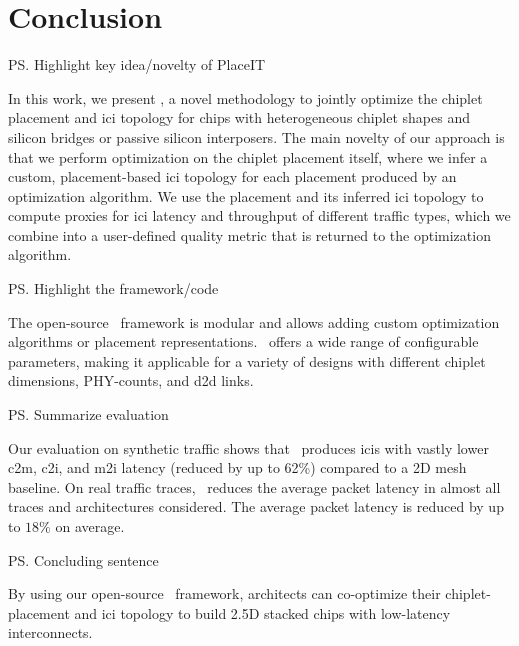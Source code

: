 \section{Conclusion}
\label{sec:conclusion}
\vspace{0.7em}

\ps{Highlight key idea/novelty of PlaceIT}

In this work, we present \name, a novel methodology to jointly optimize the chiplet placement and \gls{ici} topology for chips with heterogeneous chiplet shapes and silicon bridges or passive silicon interposers.
The main novelty of our approach is that we perform optimization on the chiplet placement itself, where we infer a custom, placement-based \gls{ici} topology for each placement produced by an optimization algorithm.
We use the placement and its inferred \gls{ici} topology to compute proxies for \gls{ici} latency and throughput of different traffic types, which we combine into a user-defined quality metric that is returned to the optimization algorithm.

\ps{Highlight the framework/code}

The open-source \name~framework is modular and allows adding custom optimization algorithms or placement representations.
\name~offers a wide range of configurable parameters, making it applicable for a variety of designs with different chiplet dimensions, PHY-counts, and \gls{d2d} links.

\ps{Summarize evaluation}

Our evaluation on synthetic traffic shows that \name~produces \gls{ici}s with vastly lower \gls{c2m}, \gls{c2i}, and \gls{m2i} latency (reduced by up to 62\%) compared to a 2D mesh baseline.
On real traffic traces, \name~reduces the average packet latency in almost all traces and architectures considered.
The average packet latency is reduced by up to $18\%$ on average.

\ps{Concluding sentence}

By using our open-source \name~framework, architects can co-optimize their chiplet-placement and \gls{ici} topology to build 2.5D stacked chips with low-latency interconnects.

